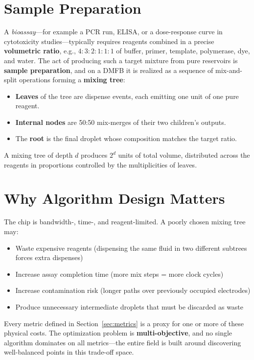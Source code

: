 \section{Sample Preparation}

A \textit{bioassay}---for example a PCR run, ELISA, or a dose-response curve in cytotoxicity studies---typically requires reagents combined in a precise \textbf{volumetric ratio}, e.g., $4:3:2:1:1:1$ of buffer, primer, template, polymerase, dye, and water. The act of producing such a target mixture from pure reservoirs is \textbf{sample preparation}, and on a DMFB it is realized as a sequence of mix-and-split operations forming a \textbf{mixing tree}:

\begin{itemize}
    \item \textbf{Leaves} of the tree are dispense events, each emitting one unit of one pure reagent.
    \item \textbf{Internal nodes} are 50:50 mix-merges of their two children's outputs.
    \item The \textbf{root} is the final droplet whose composition matches the target ratio.
\end{itemize}

A mixing tree of depth $d$ produces $2^d$ units of total volume, distributed across the reagents in proportions controlled by the multiplicities of leaves.

\section{Why Algorithm Design Matters}

The chip is bandwidth-, time-, and reagent-limited. A poorly chosen mixing tree may:

\begin{itemize}
    \item Waste expensive reagents (dispensing the same fluid in two different subtrees forces extra dispenses)
    \item Increase assay completion time (more mix steps = more clock cycles)
    \item Increase contamination risk (longer paths over previously occupied electrodes)
    \item Produce unnecessary intermediate droplets that must be discarded as waste
\end{itemize}

Every metric defined in Section~\ref{sec:metrics} is a proxy for one or more of these physical costs. The optimization problem is \textbf{multi-objective}, and no single algorithm dominates on all metrics---the entire field is built around discovering well-balanced points in this trade-off space.

